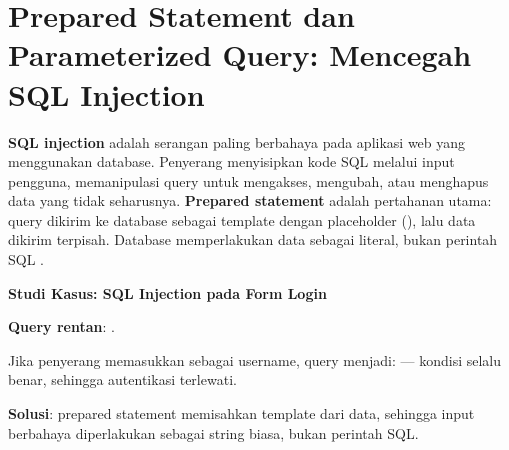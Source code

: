 \section{Prepared Statement dan Parameterized Query: Mencegah SQL Injection}

\textbf{SQL injection} adalah serangan paling berbahaya pada aplikasi web yang menggunakan database. Penyerang menyisipkan kode SQL melalui input pengguna, memanipulasi query untuk mengakses, mengubah, atau menghapus data yang tidak seharusnya. \textbf{Prepared statement} adalah pertahanan utama: query dikirim ke database sebagai template dengan placeholder (), lalu data dikirim terpisah. Database memperlakukan data sebagai literal, bukan perintah SQL \cite{phpManual}.

\begin{contoh}
\textbf{Studi Kasus: SQL Injection pada Form Login}

\textbf{Query rentan}: .

Jika penyerang memasukkan  sebagai username, query menjadi:  --- kondisi  selalu benar, sehingga autentikasi terlewati.

\textbf{Solusi}: prepared statement memisahkan template dari data, sehingga input berbahaya diperlakukan sebagai string biasa, bukan perintah SQL.
\end{contoh}


